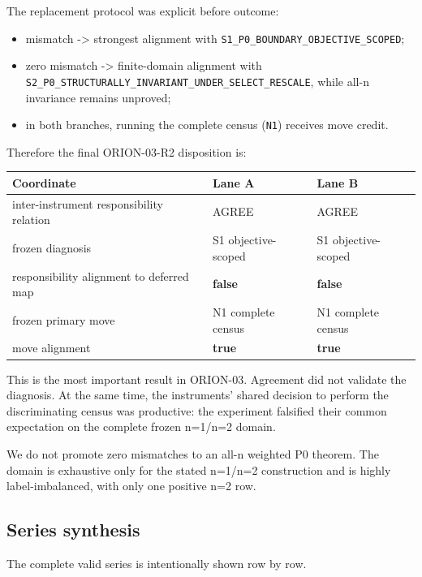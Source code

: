 \documentclass[10pt]{article}
\providecommand{\tightlist}{%
  \setlength{\itemsep}{0pt}\setlength{\parskip}{0pt}}
\begin{document}
The replacement protocol was explicit before outcome:

\begin{itemize}
\tightlist
\item
  mismatch -\textgreater{} strongest alignment with
  \texttt{S1\_P0\_BOUNDARY\_OBJECTIVE\_SCOPED};
\item
  zero mismatch -\textgreater{} finite-domain alignment with
  \texttt{S2\_P0\_STRUCTURALLY\_INVARIANT\_UNDER\_SELECT\_RESCALE},
  while all-n invariance remains unproved;
\item
  in both branches, running the complete census (\texttt{N1}) receives
  move credit.
\end{itemize}

Therefore the final ORION-03-R2 disposition is:

\begin{longtable}[]{@{}lll@{}}
\toprule\noalign{}
Coordinate & Lane A & Lane B \\
\midrule\noalign{}
\endhead
\bottomrule\noalign{}
\endlastfoot
inter-instrument responsibility relation & AGREE & AGREE \\
frozen diagnosis & S1 objective-scoped & S1 objective-scoped \\
responsibility alignment to deferred map & \textbf{false} &
\textbf{false} \\
frozen primary move & N1 complete census & N1 complete census \\
move alignment & \textbf{true} & \textbf{true} \\
\end{longtable}

This is the most important result in ORION-03. Agreement did not
validate the diagnosis. At the same time, the instruments' shared
decision to perform the discriminating census was productive: the
experiment falsified their common expectation on the complete frozen
n=1/n=2 domain.

We do not promote zero mismatches to an all-n weighted P0 theorem. The
domain is exhaustive only for the stated n=1/n=2 construction and is
highly label-imbalanced, with only one positive n=2 row.

\hypertarget{series-synthesis}{%
\subsection{Series synthesis}\label{series-synthesis}}

The complete valid series is intentionally shown row by row.
\end{document}
